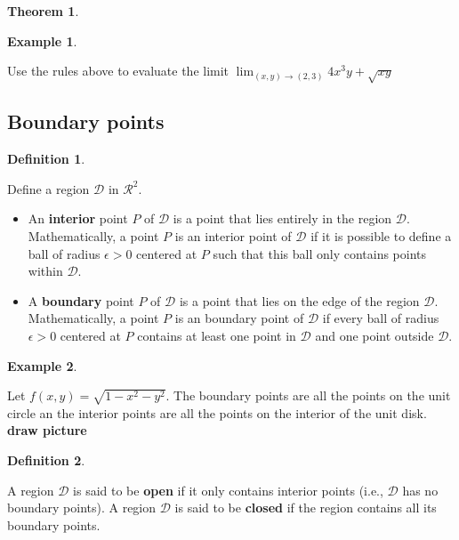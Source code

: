 \documentclass[
]{book}
\newtheorem{theorem}{Theorem}[chapter]
\theoremstyle{definition}
\newtheorem{definition}{Definition}[chapter]
\theoremstyle{definition}
\newtheorem{example}{Example}[chapter]
\theoremstyle{definition}
\theoremstyle{remark}
\begin{document}
\begin{theorem}
\end{theorem}

\begin{example}
\protect\hypertarget{exm:unlabeled-div-206}{}\label{exm:unlabeled-div-206}

Use the rules above to evaluate the limit \(\lim_{(x, y) \rightarrow (2, 3)} 4x^3y + \sqrt{xy}\)

\end{example}

\hypertarget{boundary-points}{%
\subsection{Boundary points}\label{boundary-points}}

\begin{definition}
\protect\hypertarget{def:unlabeled-div-207}{}\label{def:unlabeled-div-207}

Define a region \(\mathcal{D}\) in \(\mathcal{R}^2\).

\begin{itemize}
\item
  An \textbf{interior} point \(P\) of \(\mathcal{D}\) is a point that lies entirely in the region \(\mathcal{D}\). Mathematically, a point \(P\) is an interior point of \(\mathcal{D}\) if it is possible to define a ball of radius \(\epsilon>0\) centered at \(P\) such that this ball only contains points within \(\mathcal{D}\).
\item
  A \textbf{boundary} point \(P\) of \(\mathcal{D}\) is a point that lies on the edge of the region \(\mathcal{D}\). Mathematically, a point \(P\) is an boundary point of \(\mathcal{D}\) if every ball of radius \(\epsilon>0\) centered at \(P\) contains at least one point in \(\mathcal{D}\) and one point outside \(\mathcal{D}\).
\end{itemize}

\end{definition}

\begin{example}
\protect\hypertarget{exm:unlabeled-div-208}{}\label{exm:unlabeled-div-208}

Let \(f(x, y) = \sqrt{1 - x^2 - y^2}\). The boundary points are all the points on the unit circle an the interior points are all the points on the interior of the unit disk. \textbf{draw picture}

\end{example}

\begin{definition}
\protect\hypertarget{def:unlabeled-div-209}{}\label{def:unlabeled-div-209}

A region \(\mathcal{D}\) is said to be \textbf{open} if it only contains interior points (i.e., \(\mathcal{D}\) has no boundary points). A region \(\mathcal{D}\) is said to be \textbf{closed} if the region contains all its boundary points.

\end{definition}
\end{document}
